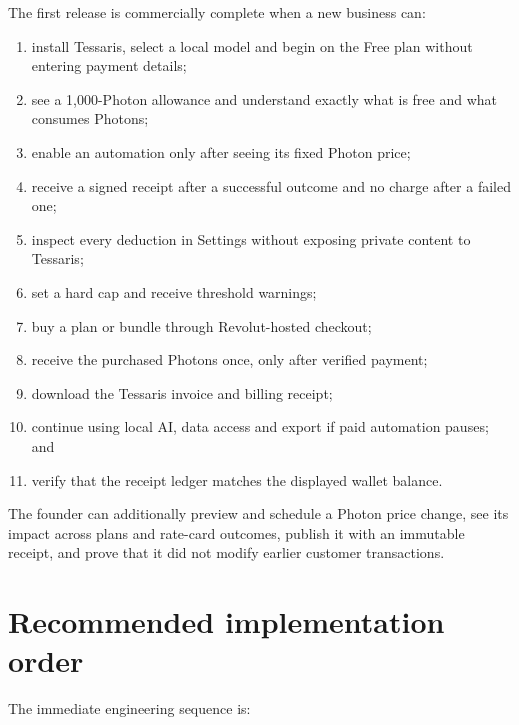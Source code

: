 \documentclass[11pt]{article}
\begin{document}
The first release is commercially complete when a new business can:

\begin{enumerate}
  \item install Tessaris, select a local model and begin on the Free plan without entering payment details;
  \item see a 1,000-Photon allowance and understand exactly what is free and what consumes Photons;
  \item enable an automation only after seeing its fixed Photon price;
  \item receive a signed receipt after a successful outcome and no charge after a failed one;
  \item inspect every deduction in Settings without exposing private content to Tessaris;
  \item set a hard cap and receive threshold warnings;
  \item buy a plan or bundle through Revolut-hosted checkout;
  \item receive the purchased Photons once, only after verified payment;
  \item download the Tessaris invoice and billing receipt;
  \item continue using local AI, data access and export if paid automation pauses; and
  \item verify that the receipt ledger matches the displayed wallet balance.
\end{enumerate}

The founder can additionally preview and schedule a Photon price change, see its impact across plans and rate-card outcomes, publish it with an immutable receipt, and prove that it did not modify earlier customer transactions.

\section{Recommended implementation order}

The immediate engineering sequence is:
\end{document}
